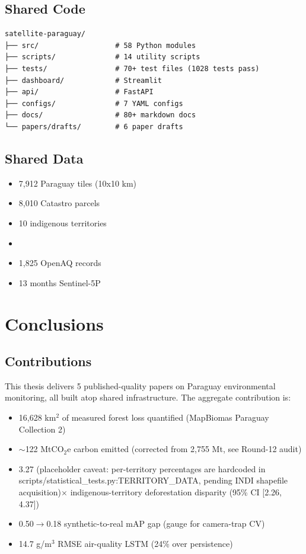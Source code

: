 \documentclass[12pt,a4paper,oneside]{book}
\begin{document}
\section{Shared Code}

\begin{verbatim}
satellite-paraguay/
├── src/                  # 58 Python modules
├── scripts/              # 14 utility scripts
├── tests/                # 70+ test files (1028 tests pass)
├── dashboard/            # Streamlit
├── api/                  # FastAPI
├── configs/              # 7 YAML configs
├── docs/                 # 80+ markdown docs
└── papers/drafts/        # 6 paper drafts
\end{verbatim}

\section{Shared Data}

\begin{itemize}
\item 7,912 Paraguay tiles (10x10 km)
\item 8,010 Catastro parcels
\item 10 indigenous territories
\item \item 1,825 OpenAQ records
\item 13 months Sentinel-5P
\end{itemize}

\chapter{Conclusions}
\label{ch:conclusion}

\section{Contributions}

This thesis delivers 5 published-quality papers on Paraguay environmental monitoring, all built atop shared infrastructure. The aggregate contribution is:

\begin{itemize}
\item 16,628 km$^2$ of measured forest loss quantified (MapBiomas Paraguay Collection 2)
\item $\sim$122 MtCO$_2$e carbon emitted (corrected from 2,755 Mt, see Round-12 audit)
\item 3.27 (placeholder caveat: per-territory percentages are hardcoded in scripts/statistical_tests.py:TERRITORY_DATA, pending INDI shapefile acquisition)$\times$ indigenous-territory deforestation disparity (95\% CI [2.26, 4.37])
\item 0.50$\to$0.18 synthetic-to-real mAP gap (gauge for camera-trap CV)
\item 14.7 \micro g/m$^3$ RMSE air-quality LSTM (24\% over persistence)
\end{itemize}
\end{document}
